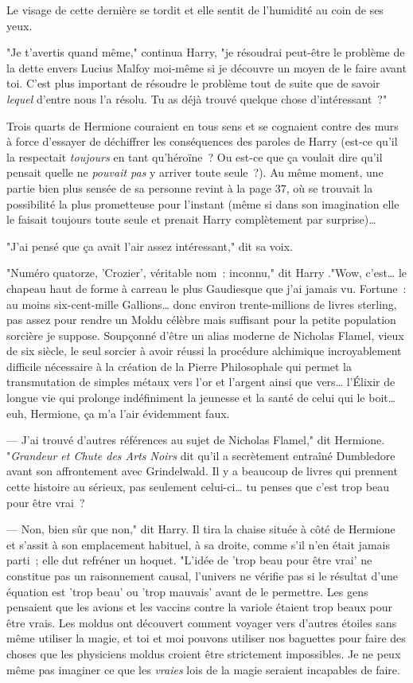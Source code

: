 Le visage de cette dernière se tordit et elle sentit de l'humidité au coin de ses yeux.

"Je t'avertis quand même," continua Harry, "je résoudrai peut-être le problème de la dette envers Lucius Malfoy moi-même si je découvre un moyen de le faire avant toi. C'est plus important de résoudre le problème tout de suite que de savoir \emph{lequel} d'entre nous l'a résolu. Tu as déjà trouvé quelque chose d'intéressant~?"

Trois quarts de Hermione couraient en tous sens et se cognaient contre des murs à force d'essayer de déchiffrer les conséquences des paroles de Harry (est-ce qu'il la respectait \emph{toujours} en tant qu'héroïne~? Ou est-ce que ça voulait dire qu'il pensait quelle ne \emph{pouvait pas} y arriver toute seule~?). Au même moment, une partie bien plus sensée de sa personne revint à la page 37, où se trouvait la possibilité la plus prometteuse pour l'instant (même si dans son imagination elle le faisait toujours toute seule et prenait Harry complètement par surprise)…

"J'ai pensé que ça avait l'air assez intéressant," dit sa voix.

"Numéro quatorze, 'Crozier', véritable nom~: inconnu," dit Harry ."Wow, c'est… le chapeau haut de forme à carreau le plus Gaudiesque que j'ai jamais vu. Fortune~: au moins six-cent-mille Gallions… donc environ trente-millions de livres sterling, pas assez pour rendre un Moldu célèbre mais suffisant pour la petite population sorcière je suppose. Soupçonné d'être un alias moderne de Nicholas Flamel, vieux de six siècle, le seul sorcier à avoir réussi la procédure alchimique incroyablement difficile nécessaire à la création de la Pierre Philosophale qui permet la transmutation de simples métaux vers l'or et l'argent ainsi que vers… l'Élixir de longue vie qui prolonge indéfiniment la jeunesse et la santé de celui qui le boit… euh, Hermione, ça m'a l'air évidemment faux.

--- J'ai trouvé d'autres références au sujet de Nicholas Flamel," dit Hermione. "\emph{Grandeur et Chute des Arts Noirs} dit qu'il a secrètement entraîné Dumbledore avant son affrontement avec Grindelwald. Il y a beaucoup de livres qui prennent cette histoire au sérieux, pas seulement celui-ci… tu penses que c'est trop beau pour être vrai~?

--- Non, bien sûr que non," dit Harry. Il tira la chaise située à côté de Hermione et s'assit à son emplacement habituel, à sa droite, comme s'il n'en était jamais parti~; elle dut refréner un hoquet. "L'idée de 'trop beau pour être vrai' ne constitue pas un raisonnement causal, l'univers ne vérifie pas si le résultat d'une équation est 'trop beau' ou 'trop mauvais' avant de le permettre. Les gens pensaient que les avions et les vaccins contre la variole étaient trop beaux pour être vrais. Les moldus ont découvert comment voyager vers d'autres étoiles sans même utiliser la magie, et toi et moi pouvons utiliser nos baguettes pour faire des choses que les physiciens moldus croient être strictement impossibles. Je ne peux même pas imaginer ce que les \emph{vraies} lois de la magie seraient incapables de faire.

